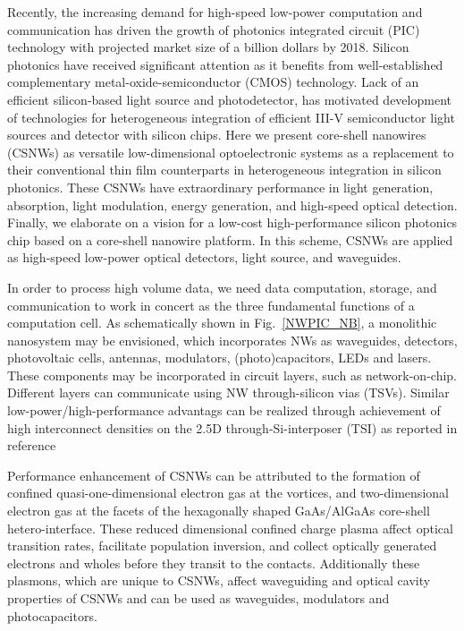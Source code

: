 Recently, the increasing demand for high-speed low-power computation and
communication has driven the growth of photonics integrated circuit (PIC)
technology with projected market size of a billion dollars by 2018. Silicon
photonics have received significant attention as it benefits from
well-established complementary metal-oxide-semiconductor (CMOS) technology.
Lack of an efficient silicon-based light source and photodetector, has
motivated development of technologies for heterogeneous integration of
efficient III-V semiconductor light sources and detector with silicon chips.
Here we present core-shell nanowires (CSNWs) as versatile low-dimensional
optoelectronic systems as a replacement to their conventional thin film
counterparts in heterogeneous integration in silicon photonics. These CSNWs
have extraordinary performance in light generation, absorption, light
modulation, energy generation, and high-speed optical detection. Finally, we
elaborate on a vision for a low-cost high-performance silicon photonics chip
based on a core-shell nanowire platform. In this scheme, CSNWs are applied as
high-speed low-power optical detectors, light source, and waveguides.

In order to process high volume data, we need data computation, storage, and
communication to work in concert as the three fundamental functions of a
computation cell. As schematically shown in Fig.~\ref{NWPIC_NB}, a monolithic
nanosystem may be envisioned, which incorporates NWs as waveguides, detectors,
photovoltaic cells, antennas, modulators, (photo)capacitors, LEDs and lasers.
These components may be incorporated in circuit layers, such as
network-on-chip. Different layers can communicate using NW through-silicon vias
(TSVs). Similar low-power/high-performance advantags can be realized through
achievement of high interconnect densities on the 2.5D through-Si-interposer
(TSI) as reported in reference~\cite{Zhang:2015ec} 

Performance enhancement of CSNWs can be attributed to the formation of confined
quasi-one-dimensional electron gas at the vortices, and two-dimensional
electron gas at the facets of the hexagonally shaped GaAs/AlGaAs core-shell
hetero-interface.  These reduced dimensional confined charge plasma affect
optical transition rates, facilitate population inversion, and collect
optically generated electrons and wholes before they transit to the contacts.
Additionally these plasmons, which are unique to CSNWs, affect waveguiding and
optical cavity properties of CSNWs and can be used as waveguides, modulators
and photocapacitors.

